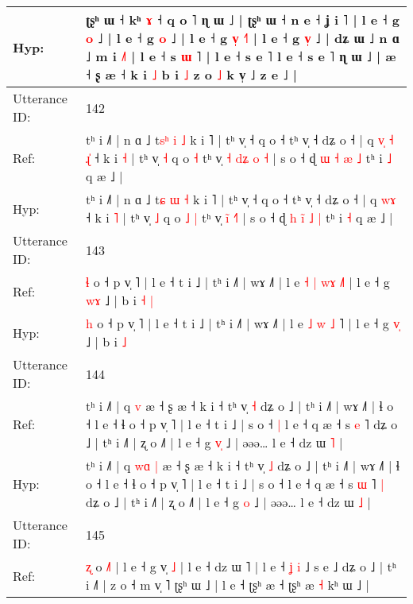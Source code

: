 \documentclass[10pt]{article}
\DeclareRobustCommand{\hl}[1]{{\textcolor{red}{#1}}}
\begin{document}
\begin{longtable}{ll}
 \\
Hyp: & ʈʂʰ ɯ ˧ kʰ \hl{ɤ} ˧ q o ˥ ɳ ɯ ˩ | ʈʂʰ ɯ ˧ n e ˧ ʝ i ˥ | l e ˧ g \hl{}\hl{o} ˩ | l e ˧ g \hl{}\hl{o} ˩ | l e ˧ g \hl{v}\hl{̩} \hl{˧}\hl{˥} | l e ˧ g \hl{v}\hl{̩} ˩ | dʑ ɯ ˩ n ɑ ˩ m i \hl{˩}˥ | l e ˧ s \hl{ɯ} ˥ | l e ˧ s e ˥\hl{}\hl{} l e ˧ s e ˥ ɳ ɯ ˩ | æ ˧ ʂ æ ˧ k i\hl{}\hl{} \hl{˩} b i \hl{˩} z o \hl{˩} k v̩ ˩ z e ˩ |
 \\
\midrule
Utterance ID: & 142 \\
Ref: & tʰ i ˩˥ | n ɑ ˩ t\hl{s}\hl{ʰ} \hl{i} \hl{˩} k i ˥ | tʰ v̩ ˧ q o ˧ tʰ v̩ ˧ dʑ o ˧ | q\hl{ }\hl{v}\hl{̩}\hl{ }\hl{˧} \hl{ɻ}\hl{̍} ˧ k i \hl{˧} | tʰ v̩ \hl{˧} q o\hl{}\hl{} \hl{˧} tʰ v̩\hl{ }\hl{˧} \hl{d}\hl{ʑ} \hl{o}\hl{ }\hl{˧} | s o ˧ ɖ \hl{ɯ} \hl{}\hl{˧} \hl{æ} \hl{˩} tʰ i \hl{˩} q æ ˩ |
 \\
Hyp: & tʰ i ˩˥ | n ɑ ˩ t\hl{}\hl{ɕ} \hl{ɯ} \hl{˧} k i ˥ | tʰ v̩ ˧ q o ˧ tʰ v̩ ˧ dʑ o ˧ | q\hl{}\hl{}\hl{}\hl{}\hl{} \hl{w}\hl{ɤ} ˧ k i \hl{˥} | tʰ v̩ \hl{˩} q o\hl{ }\hl{˩} \hl{|} tʰ v̩\hl{}\hl{} \hl{i}\hl{̃} \hl{}\hl{˧}\hl{˥} | s o ˧ ɖ \hl{h} \hl{i}\hl{̃} \hl{˩} \hl{|} tʰ i \hl{˧} q æ ˩ |
 \\
\midrule
Utterance ID: & 143 \\
Ref: & \hl{ɬ} o ˧ p v̩ ˥ | l e ˧ t i ˩ | tʰ i ˩˥ | wɤ ˩˥ | l e \hl{˧} \hl{|} \hl{w}\hl{ɤ} \hl{˩}˥ | l e ˧ g \hl{w}\hl{ɤ} ˩ | b i\hl{ }\hl{˧} \hl{|}
 \\
Hyp: & \hl{h} o ˧ p v̩ ˥ | l e ˧ t i ˩ | tʰ i ˩˥ | wɤ ˩˥ | l e \hl{˩} \hl{w} \hl{}\hl{˩} \hl{}˥ | l e ˧ g \hl{v}\hl{̩} ˩ | b i\hl{}\hl{} \hl{˩}
 \\
\midrule
Utterance ID: & 144 \\
Ref: & tʰ i ˩˥ | q\hl{}\hl{}\hl{} \hl{v} æ ˧ ʂ æ ˧ k i ˧ tʰ v̩ \hl{˧} dʑ o ˩ | tʰ i ˩˥ | wɤ ˩˥ | ɬ o ˧ l e ˧ ɬ o ˧ p v̩ ˥ | l e ˧ t i ˩ | s o ˧\hl{ }\hl{|} l e ˧ q æ ˧ s \hl{e} ˥\hl{}\hl{} dʑ o ˩ | tʰ i ˩˥ | ʐ o ˩˥ | l e ˧ g \hl{v}\hl{̩} ˩ | əəə… l e ˧ dz ɯ \hl{˥} |
 \\
Hyp: & tʰ i ˩˥ | q\hl{ }\hl{w}\hl{ɑ} \hl{|} æ ˧ ʂ æ ˧ k i ˧ tʰ v̩ \hl{˩} dʑ o ˩ | tʰ i ˩˥ | wɤ ˩˥ | ɬ o ˧ l e ˧ ɬ o ˧ p v̩ ˥ | l e ˧ t i ˩ | s o ˧\hl{}\hl{} l e ˧ q æ ˧ s \hl{ɯ} ˥\hl{ }\hl{|} dʑ o ˩ | tʰ i ˩˥ | ʐ o ˩˥ | l e ˧ g \hl{}\hl{o} ˩ | əəə… l e ˧ dz ɯ \hl{˩} |
 \\
\midrule
Utterance ID: & 145 \\
Ref: & \hl{ʐ} o \hl{˩}˥ | l e ˧ g v̩ \hl{˩} | l e ˧ dz ɯ ˥ | l e ˧ \hl{ʝ}\hl{ }\hl{i} ˩ s e ˩\hl{}\hl{} dʑ o ˩ | tʰ i ˩˥ | z o ˧ m v̩ ˥ ʈʂʰ ɯ ˩ | l e ˧ ʈʂʰ æ ˧ ʈʂʰ æ \hl{˧} kʰ ɯ ˩ |
 \\

\end{longtable}
\end{document}
